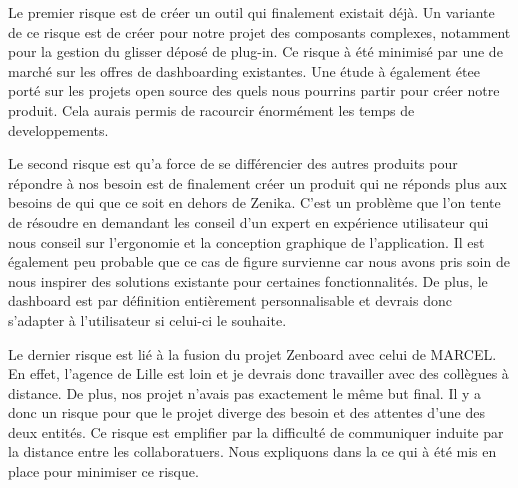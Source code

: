   Le premier risque est de créer un outil qui finalement existait déjà. Un variante de ce risque est de créer pour notre projet des composants complexes, notamment pour la gestion du glisser déposé de plug-in. Ce risque à été minimisé par une de marché sur les offres de dashboarding existantes. Une étude à également étee porté sur les projets open source des quels nous pourrins partir pour créer notre produit. Cela aurais permis de racourcir énormément les temps de developpements.

  Le second risque est qu'a force de se différencier des autres produits pour répondre à nos besoin est de finalement créer un produit qui ne réponds plus aux besoins de qui que ce soit en dehors de Zenika. C'est un problème que l'on tente de résoudre en demandant les conseil d'un expert en expérience utilisateur qui nous conseil sur l'ergonomie et la conception graphique de l'application. Il est également peu probable que ce cas de figure survienne car nous avons pris soin de nous inspirer des solutions existante pour certaines fonctionnalités. De plus, le dashboard est par définition entièrement personnalisable et devrais donc s'adapter à l'utilisateur si celui-ci le souhaite.

  Le dernier risque est lié à la fusion du projet Zenboard avec celui de MARCEL. En effet, l'agence de Lille est loin et je devrais donc travailler avec des collègues à distance. De plus, nos projet n'avais pas exactement le même but final. Il y a donc un risque pour que le projet diverge des besoin et des attentes d'une des deux entités. Ce risque est emplifier par la difficulté de communiquer induite par la distance entre les collaboratuers. Nous expliquons dans la  ce qui à été mis en place pour minimiser ce risque.